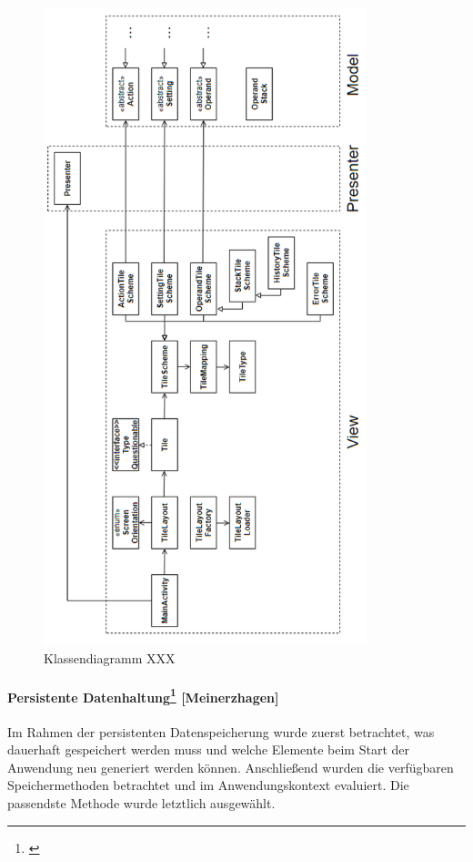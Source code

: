 
\enlargethispage{3\baselineskip}

\begin{figure}[!h]
	\includegraphics[width=\textwidth,height=50em,keepaspectratio]{img/schnittstellen-klassendiagramm}
	\caption[Klassendiagramm]{Klassendiagramm XXX\footnotemark}
\end{figure}


\clearpage

\paragraph{Persistente Datenhaltung\protect\footnote{\cite[vgl.][]{ogbo2016}} [Meinerzhagen]}

Im Rahmen der persistenten Datenspeicherung wurde zuerst betrachtet, was dauerhaft gespeichert werden muss und welche Elemente beim Start der Anwendung neu generiert werden können. Anschließend wurden die verfügbaren Speichermethoden betrachtet und im Anwendungskontext evaluiert. Die passendste Methode wurde letztlich ausgewählt.

